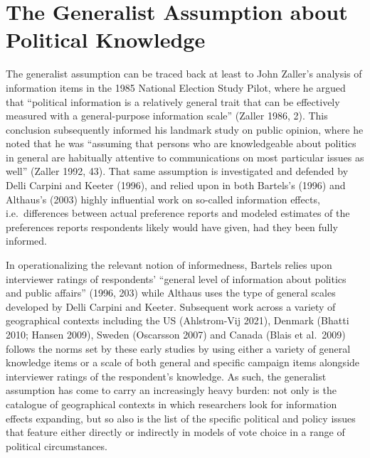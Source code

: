 \documentclass[12pt,halfline,a4paper,]{ouparticle}
\begin{document}
\hypertarget{the-generalist-assumption-about-political-knowledge}{%
\section{The Generalist Assumption about Political
Knowledge}\label{the-generalist-assumption-about-political-knowledge}}

The generalist assumption can be traced back at least to John Zaller's
analysis of information items in the 1985 National Election Study Pilot,
where he argued that ``political information is a relatively general
trait that can be effectively measured with a general-purpose
information scale'' (Zaller 1986, 2). This conclusion subsequently
informed his landmark study on public opinion, where he noted that he
was ``assuming that persons who are knowledgeable about politics in
general are habitually attentive to communications on most particular
issues as well'' (Zaller 1992, 43). That same assumption is investigated
and defended by Delli Carpini and Keeter (1996), and relied upon in both
Bartels's (1996) and Althaus's (2003) highly influential work on
so-called information effects, i.e.~differences between actual
preference reports and modeled estimates of the preferences reports
respondents likely would have given, had they been fully informed.

In operationalizing the relevant notion of informedness, Bartels relies
upon interviewer ratings of respondents' ``general level of information
about politics and public affairs'' (1996, 203) while Althaus uses the
type of general scales developed by Delli Carpini and Keeter. Subsequent
work across a variety of geographical contexts including the US
(Ahlstrom-Vij 2021), Denmark (Bhatti 2010; Hansen 2009), Sweden
(Oscarsson 2007) and Canada (Blais et al.~2009) follows the norms set by
these early studies by using either a variety of general knowledge items
or a scale of both general and specific campaign items alongside
interviewer ratings of the respondent's knowledge. As such, the
generalist assumption has come to carry an increasingly heavy burden:
not only is the catalogue of geographical contexts in which researchers
look for information effects expanding, but so also is the list of the
specific political and policy issues that feature either directly or
indirectly in models of vote choice in a range of political
circumstances.
\end{document}
